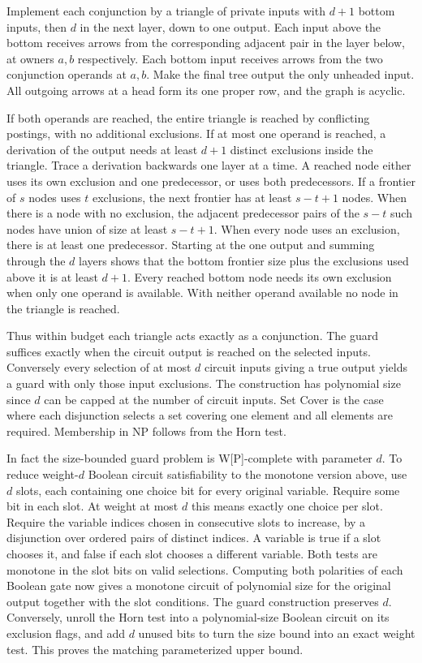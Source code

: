 Implement each conjunction by a
triangle of private inputs with $d+1$ bottom inputs,
then $d$ in the next layer, down to one output.
Each input above the bottom receives arrows from
the corresponding adjacent pair in the layer below,
at owners $a,b$ respectively. Each bottom input
receives arrows from the two conjunction operands
at $a,b$. Make the final tree output the only
unheaded input. All outgoing arrows at a head
form its one proper row, and the graph is acyclic.

If both operands are reached, the entire triangle
is reached by conflicting postings, with no additional
exclusions. If at most one operand is reached, a
derivation of the output needs at least $d+1$ distinct
exclusions inside the triangle. Trace a derivation
backwards one layer at a time. A reached node either
uses its own exclusion and one predecessor, or uses
both predecessors. If a frontier of $s$ nodes uses
$t$ exclusions, the next frontier has at least
$s-t+1$ nodes. When there is a node with no exclusion,
the adjacent predecessor pairs of the $s-t$ such nodes
have union of size at least $s-t+1$. When every node
uses an exclusion, there is at least one predecessor.
Starting at the one output and summing through the
$d$ layers shows that the bottom frontier size plus
the exclusions used above it is at least $d+1$.
Every reached bottom node needs its own exclusion
when only one operand is available. With neither
operand available no node in the triangle is reached.

Thus within budget each triangle acts exactly as a
conjunction. The guard suffices exactly when the
circuit output is reached on the selected inputs.
Conversely every selection of at most $d$ circuit inputs
giving a true output yields a guard with only those
input exclusions. The construction has polynomial size
since $d$ can be capped at the number of circuit inputs.
Set Cover is the case where each disjunction selects
a set covering one element and all elements are required.
Membership in NP follows from the Horn test.

In fact the size-bounded guard problem is W[P]-complete
with parameter $d$. To reduce weight-$d$ Boolean
circuit satisfiability to the monotone version above,
use $d$ slots, each containing one choice bit for every
original variable. Require some bit in each slot. At
weight at most $d$ this means exactly one choice per
slot. Require the variable indices chosen in consecutive
slots to increase, by a disjunction over ordered pairs
of distinct indices.
A variable is true if a slot chooses it, and false if
each slot chooses a different variable. Both tests are
monotone in the slot bits on valid selections. Computing
both polarities of each Boolean gate now gives a
monotone circuit of polynomial size for the original
output together with the slot conditions. The guard
construction preserves $d$. Conversely, unroll the
Horn test into a polynomial-size Boolean circuit on its
exclusion flags, and add $d$ unused bits to turn the
size bound into an exact weight test. This proves the
matching parameterized upper bound.

